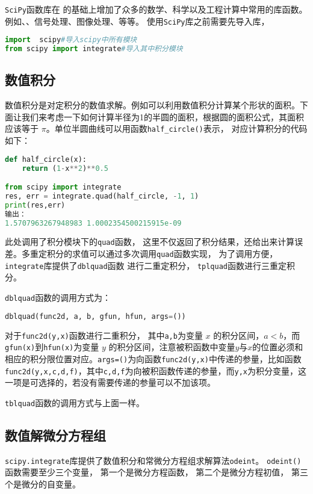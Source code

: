 
\verb`SciPy`函数库在 的基础上增加了众多的数学、科学以及工程计算中常用的库函数。例如、、信号处理、图像处理、等等。
使用\verb`SciPy`库之前需要先导入库，
\begin{lstlisting}[language=python]
import  scipy#导入scipy中所有模块
from scipy import integrate#导入其中积分模块
\end{lstlisting}
\subsection{数值积分}
数值积分是对定积分的数值求解。例如可以利用数值积分计算某个形状的面积。下面让我们来考虑一下如何计算半径为1的半圆的面积，根据圆的面积公式，其面积应该等于 $\pi$。单位半圆曲线可以用函数\verb`half_circle()`表示， 对应计算积分的代码如下：
\begin{lstlisting}[language=python]
def half_circle(x):
    return (1-x**2)**0.5

from scipy import integrate
res, err = integrate.quad(half_circle, -1, 1)
print(res,err)
输出：
1.5707963267948983 1.0002354500215915e-09
\end{lstlisting}
此处调用了积分模块下的\verb`quad`函数， 这里不仅返回了积分结果，还给出来计算误差。多重定积分的求值可以通过多次调用\verb`quad`函数实现， 为了调用方便， \verb`integrate`库提供了\verb`dblquad`函数
进行二重定积分， \verb`tplquad`函数进行三重定积分。

\verb`dblquad`函数的调用方式为：
\begin{lstlisting}[language=python]
dblquad(func2d, a, b, gfun, hfun, args=())
\end{lstlisting}
对于\verb`func2d(y,x)`函数进行二重积分， 其中\verb`a,b`为变量 $x$ 的积分区间，$ a < b $，而\verb`gfun(x)`到\verb`hfun(x)`为变量 $y$ 的积分区间，注意被积函数中变量$ y $与$ x $的位置必须和相应的积分限位置对应。\verb`args=()`为向函数\verb`func2d(y,x)`中传递的参量，比如函数\verb`func2d(y,x,c,d,f)`，其中\verb`c,d,f`为向被积函数传递的参量，而\verb`y,x`为积分变量，这一项是可选择的，若没有需要传递的参量可以不加该项。

\verb`tblquad`函数的调用方式与上面一样。

\subsection{数值解微分方程组}
\verb`scipy.integrate`库提供了数值积分和常微分方程组求解算法\verb`odeint`。
\verb`odeint()`函数需要至少三个变量， 第一个是微分方程函数， 第二个是微分方程初值， 第三个是微分的自变量。

